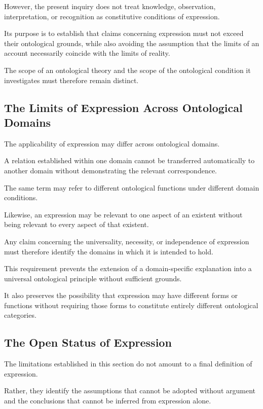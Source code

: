 However, the present inquiry does not treat
knowledge, observation, interpretation, or
recognition as constitutive conditions of expression.

Its purpose is to establish that claims concerning
expression must not exceed their ontological
grounds, while also avoiding the assumption
that the limits of an account necessarily coincide
with the limits of reality.

The scope of an ontological theory and the scope
of the ontological condition it investigates
must therefore remain distinct.

\subsection{The Limits of Expression Across Ontological Domains}

The applicability of expression may differ across
ontological domains.

A relation established within one domain cannot
be transferred automatically to another domain
without demonstrating the relevant correspondence.

The same term may refer to different ontological
functions under different domain conditions.

Likewise, an expression may be relevant to one
aspect of an existent without being relevant
to every aspect of that existent.

Any claim concerning the universality, necessity,
or independence of expression must therefore
identify the domains in which it is intended
to hold.

This requirement prevents the extension of
a domain-specific explanation into a universal
ontological principle without sufficient grounds.

It also preserves the possibility that expression
may have different forms or functions without
requiring those forms to constitute entirely
different ontological categories.

\subsection{The Open Status of Expression}

The limitations established in this section do
not amount to a final definition of expression.

Rather, they identify the assumptions that cannot
be adopted without argument and the conclusions
that cannot be inferred from expression alone.


